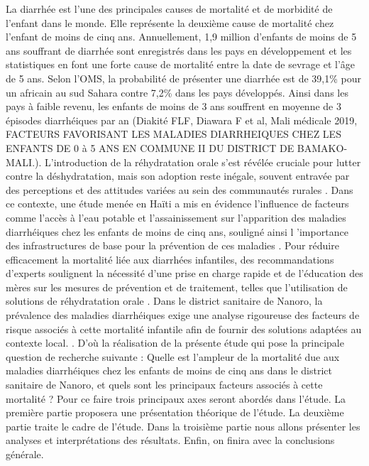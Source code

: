 \documentclass[12pt,a4paper]{report}
\begin{document}
	La diarrhée est l’une des principales causes de mortalité et de morbidité de l’enfant dans le monde. Elle représente la deuxième cause de mortalité chez l’enfant de moins de cinq ans. Annuellement, 1,9 million d'enfants de	moins de 5 ans souffrant de diarrhée sont enregistrés dans les pays en développement et les statistiques en font une forte cause de mortalité entre la date de sevrage et l’âge de 5 ans. Selon l’OMS, la probabilité de
	présenter une diarrhée est de 39,1\% pour un africain au sud Sahara contre 7,2\% dans les pays développés. Ainsi dans les pays à faible revenu, les enfants de moins de 3 ans souffrent en moyenne de 3 épisodes diarrhéiques par an (Diakité FLF, Diawara F et al, Mali médicale 2019, FACTEURS FAVORISANT LES MALADIES DIARRHEIQUES CHEZ LES ENFANTS DE 0 à 5 ANS EN
	COMMUNE II DU DISTRICT DE BAMAKO-MALI.). L'introduction de la réhydratation orale s'est révélée cruciale pour lutter contre la déshydratation, mais son adoption reste inégale, souvent entravée par des perceptions et des attitudes variées au sein des communautés rurales \cite{ohale_attitudbs_nodate}. Dans ce contexte, une étude menée en Haïti a mis en évidence l'influence de facteurs comme l'accès à l'eau potable et l'assainissement sur l'apparition des maladies diarrhéiques chez les enfants de moins de cinq ans, souligné ainsi l 'importance des infrastructures de base pour la prévention de ces maladies \cite{gagnon_presente_nodate}. Pour réduire efficacement la mortalité liée aux diarrhées infantiles, des recommandations d'experts soulignent la nécessité d'une prise en charge rapide et de l'éducation des mères sur les mesures de prévention et de traitement, telles que l'utilisation de solutions de réhydratation orale \cite{noauthor_diarrhee_2018}. Dans le district sanitaire de Nanoro, la prévalence des maladies diarrhéiques exige une analyse rigoureuse des facteurs de risque associés à cette mortalité infantile afin de fournir des solutions adaptées au contexte local. . D’où la réalisation de la présente étude qui pose la principale question de recherche suivante : Quelle est l'ampleur de la mortalité due aux maladies diarrhéiques chez les enfants de moins de cinq ans dans le district sanitaire de Nanoro, et quels sont les principaux facteurs associés à cette mortalité ?  Pour ce faire trois principaux axes seront abordés dans l’étude. La première partie proposera une présentation théorique de l’étude. La deuxième partie traite le cadre de l’étude. Dans la troisième partie nous allons présenter les analyses et interprétations des résultats. Enfin, on finira avec la conclusions générale.
	
\end{document}
